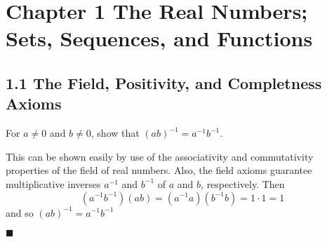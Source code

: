 \documentclass[12pt]{article}
\renewcommand{\qed}{\hfill$\blacksquare$}
\renewenvironment{proof}{\begin{addmargin}[1em]{0em}\begin{newproof}}{\end{newproof}\end{addmargin}\qed}
\newenvironment{problem}[2][Problem]{\begin{trivlist}
\item[\hskip \labelsep {\bfseries #1}\hskip \labelsep {\bfseries #2.}]}{\end{trivlist}}
\begin{document}

\rhead{\today}



\section*{Chapter 1 The Real Numbers; Sets, Sequences, and Functions}

\subsection*{1.1 The Field, Positivity, and Completness Axioms}

\begin{problem}{1.1.1}
For $a\neq 0$ and $b\neq 0$, show that $\left(ab\right)^{-1}=a^{-1}b^{-1}$.
\end{problem}
\begin{proof}
This can be shown easily by use of the associativity and commutativity properties of the field of real numbers. Also, the field axioms guarantee multiplicative inverses $a^{-1}$ and $b^{-1}$ of $a$ and $b$, respectively. Then
\[ \left(a^{-1}b^{-1}\right)\left(ab\right) = \left(a^{-1}a\right)\left(b^{-1}b\right) = 1\cdot 1 = 1\] and so $\left(ab\right)^{-1} = a^{-1}b^{-1} $
\end{proof}
\end{document}
